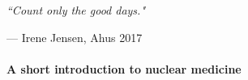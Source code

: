 \documentclass[twoside,english]{uiofysmaster/uiofysmaster}
\begin{document}
\epigraph{\itshape ``Count only the good days."}{--- \textup{ Irene Jensen}, Ahus 2017}
 









\paragraph{A short introduction to nuclear medicine} \mbox{}
\end{document}
